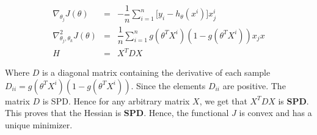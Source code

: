\begin{answer}

 \begin{eqnarray}
   \nabla_{\theta_j} J(\theta) &=& -\dfrac{1}{n} \sum_{i=1}^n
   \big[ y_i - h_\theta(x^i)\big]x_j^i\\
   \nabla_{\theta_j,\theta_k}^2 J(\theta) & = & \dfrac{1}{n} \sum_{i=1}^n
   g(\theta^TX^i)(1-g(\theta^TX^i))x_jx\\
   H &=& X^T D X
 \end{eqnarray} 

 Where $D$ is a diagonal matrix containing the derivative of each sample
 $D_{ii} = g(\theta^TX^i)(1- g(\theta^T X^i))$. Since the elements
 $D_{ii}$ are positive. The matrix $D$ is SPD. Hence for any arbitrary
 matrix $X$, we get that $X^TDX$ is \textbf{SPD}.\\

 This proves that the Hessian is \textbf{SPD}. Hence, the
 functional $J$ is convex and has a unique minimizer.
\end{answer}
